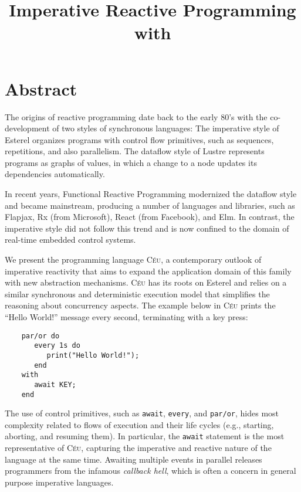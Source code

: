 \documentclass[11pt,a4paper]{article}
\title{
    Imperative Reactive Programming with \CEU
}
\newcommand{\CEU}{\textsc{C\'{e}u}\xspace}
\newcommand{\code}[1] {{\small{\texttt{#1}}}}
\begin{document}
\maketitle


\section{Abstract}
The origins of reactive programming date back to the early 80's with the 
co-development of two styles of synchronous languages:
%
The imperative style of Esterel organizes programs with control flow 
primitives, such as sequences, repetitions, and also parallelism.
%
The dataflow style of Lustre represents programs as graphs of values, in which 
a change to a node updates its dependencies automatically.

In recent years, Functional Reactive Programming modernized the dataflow style 
and became mainstream, producing a number of languages and libraries, such as
Flapjax, Rx (from Microsoft), React (from Facebook), and Elm.
%
In contrast, the imperative style did not follow this trend and is now confined 
to the domain of real-time embedded control systems.

We present the programming language \CEU, a contemporary outlook of imperative 
reactivity that aims to expand the application domain of this family with new 
abstraction mechanisms.
%
\CEU has its roots on Esterel and relies on a similar synchronous and 
deterministic execution model that simplifies the reasoning about concurrency 
aspects.
%
%
The example below in \CEU prints the ``Hello World!'' message every second, 
terminating with a key press:

\begin{verbatim}
    par/or do
       every 1s do
          print("Hello World!");
       end
    with
       await KEY;
    end
\end{verbatim}

The use of control primitives, such as \code{await}, \code{every}, and 
\code{par/or}, hides most complexity related to flows of execution and their 
life cycles (e.g., starting, aborting, and resuming them).
%
In particular, the \code{await} statement is the most representative of \CEU, 
capturing the imperative and reactive nature of the language at the same time.
%
Awaiting multiple events in parallel releases programmers from the infamous 
\emph{callback hell}, which is often a concern in general purpose imperative 
languages.
\end{document}
